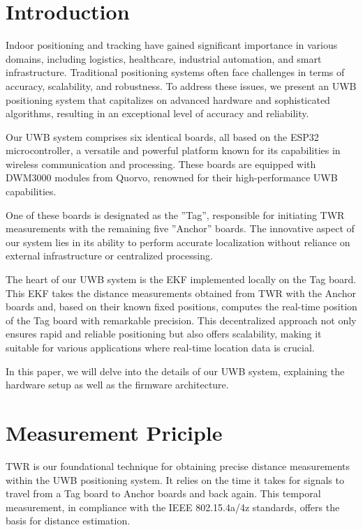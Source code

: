 \documentclass[10pt,a4paper,twocolumn]{article}
\begin{document}

\section{Introduction}\label{section:intro}
Indoor positioning and tracking have gained significant importance in various domains,
including logistics, healthcare, industrial automation, and smart infrastructure.
Traditional positioning systems often face challenges in terms of accuracy, scalability,
and robustness.
To address these issues, we present an \ac{UWB} positioning system that capitalizes
on advanced hardware and sophisticated algorithms,
resulting in an exceptional level of accuracy and reliability.

Our \ac{UWB} system comprises six identical boards,
all based on the ESP32 microcontroller, a versatile and powerful platform known
for its capabilities in wireless communication and processing.
These boards are equipped with DWM3000 modules from Quorvo,
renowned for their high-performance UWB capabilities.

One of these boards is designated as the ''Tag'',
responsible for initiating \ac{TWR} measurements with the remaining five ''Anchor'' boards.
The innovative aspect of our system lies in its ability to perform accurate localization
without reliance on external infrastructure or centralized processing.

The heart of our UWB system is the \ac{EKF} implemented locally on the Tag board.
This EKF takes the distance measurements obtained from TWR with the Anchor boards and,
based on their known fixed positions, computes the real-time position of the Tag board
with remarkable precision.
This decentralized approach not only ensures rapid and reliable positioning but also
offers scalability, making it suitable for various applications where real-time location
data is crucial.

In this paper, we will delve into the details of our \ac{UWB} system,
explaining the hardware setup as well as the firmware architecture.

\section{Measurement Priciple}\label{Section:principle}
\acf{TWR} is our foundational technique for obtaining precise distance
measurements within the UWB positioning system.
It relies on the time it takes for signals to travel from a Tag board to Anchor boards
and back again.
This temporal measurement, in compliance with the IEEE 802.15.4a/4z standards,
offers the basis for distance estimation.
\end{document}
